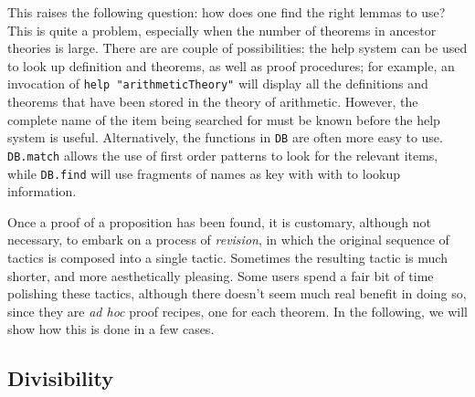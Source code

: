 \documentclass[12pt,fleqn,a4paper]{report}
\begin{document}
This raises the following question: how does one find the right lemmas
to use? This is quite a problem, especially when the number of
theorems in ancestor theories is large. There are are couple of
possibilities: the help system can be used to look up definition and
theorems, as well as proof procedures; for example, an invocation of
\verb+help "arithmeticTheory"+ will display all the definitions and
theorems that have been stored in the theory of arithmetic. However,
the complete name of the item being searched for must be known before
the help system is useful. Alternatively, the functions in \verb+DB+
are often more easy to use. \verb+DB.match+ allows the use of first
order patterns to look for the relevant items, while \verb+DB.find+
will use fragments of names as key with with to lookup information.

Once a proof of a proposition has been found, it is customary, although
not necessary, to embark on a process of {\it revision}, in which the
original sequence of tactics is composed into a single tactic. Sometimes
the resulting tactic is much shorter, and more aesthetically
pleasing. Some users spend a fair bit of time polishing these tactics,
although there doesn't seem much real benefit in doing so, since they
are {\it ad hoc\/} proof recipes, one for each theorem. In the
following, we will show how this is done in a few cases.

\subsection{Divisibility}
\end{document}
